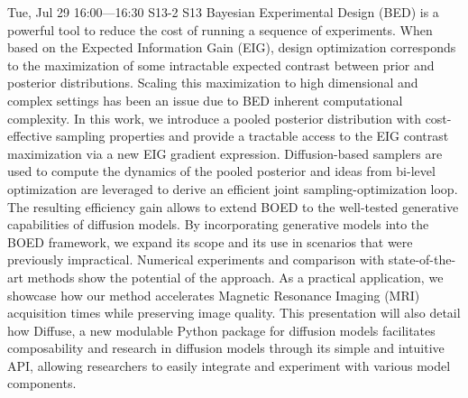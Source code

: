 \begin{talk}
  {}%
  {}%
  {}%
  {}%
  {}%
  {}%
  {Tue, Jul 29 16:00---16:30}%
  {S13-2}%
  {S13}%
    Bayesian  Experimental Design (BED) is a powerful tool to reduce the cost of running a sequence of experiments.
    When based on the Expected Information Gain (EIG), design optimization corresponds to the maximization of some intractable expected  contrast between prior and posterior distributions.
    Scaling this maximization to high dimensional and complex settings has been an issue due to BED inherent computational complexity.
    In this work, we introduce a pooled posterior distribution with cost-effective sampling properties and provide a tractable access to the EIG contrast maximization via a new EIG gradient expression. Diffusion-based samplers are used to compute the dynamics of the pooled posterior and ideas from bi-level optimization are leveraged to derive an efficient joint sampling-optimization loop.
    The resulting efficiency gain allows to extend BOED to the well-tested generative capabilities of diffusion models.
    By incorporating generative models into the BOED framework, we expand its scope and its use in scenarios that were previously impractical. Numerical experiments and comparison with state-of-the-art methods show the potential of the approach.
    As a practical application, we showcase how our method accelerates Magnetic Resonance Imaging (MRI) acquisition times while preserving image quality.
    This presentation will also detail how Diffuse, a new modulable Python package for diffusion models facilitates composability and research in diffusion models through its simple and intuitive API, allowing researchers to easily integrate and experiment with various model components.

\end{talk}

